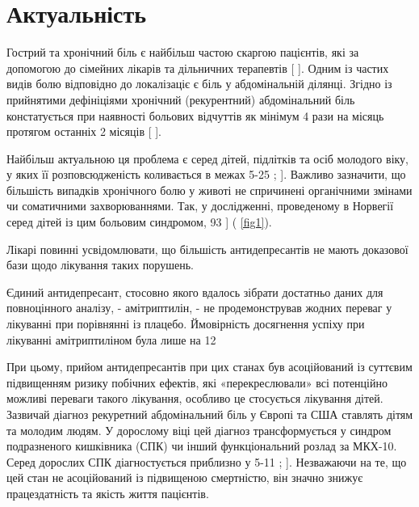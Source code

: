 \section {Актуальність}
Гострий та хронічний біль є найбільш частою скаргою пацієнтів, які 
 за допомогою до сімейних лікарів та дільничних терапевтів [
\cite{1}]. Одним із частих видів болю відповідно до локалізаціє є біль у абдомінальній ділянці. Згідно із прийнятими дефініціями хронічний (рекурентний) абдомінальний біль констатується при наявності больових відчуттів як мінімум 4 рази на місяць протягом останніх 2 місяців [
\cite{2}]. 
\par 
Найбільш актуальною ця проблема є серед дітей, підлітків та осіб молодого віку, у яких її розповсюдженість коливається в межах 5-25%
\cite{2}; 
\cite{3}]. Важливо зазначити, що більшість випадків хронічного болю у животі не спричинені органічними змінами чи соматичними захворюваннями. Так, у дослідженні, проведеному в Норвегії серед дітей із цим больовим синдромом, 93%
\cite{4}] (
\ref{fig1}). 
\par 
\item Лікарі повинні усвідомлювати, що більшість антидепресантів не мають доказової бази щодо лікування таких порушень.
\item Єдиний антидепресант, стосовно якого вдалось зібрати достатньо даних для повноцінного аналізу, - амітриптилін, - не продемонстрував жодних переваг у лікуванні при порівнянні із плацебо. Ймовірність досягнення успіху при лікуванні амітриптиліном була лише на 12%
\item При цьому, прийом антидепресантів при цих станах був асоційований із суттєвим підвищенням ризику побічних ефектів, які «перекреслювали» всі потенційно можливі переваги такого лікування, особливо це стосується лікування дітей.
Зазвичай діагноз рекуретний абдомінальний біль у Європі та США ставлять дітям та молодим людям. У дорослому віці цей діагноз трансформується у синдром подразненого кишківника (СПК) чи інший функціональний розлад за МКХ-10. Серед дорослих СПК діагностується приблизно у 5-11%
\cite{5};
\cite{6}]. Незважаючи на те, що цей стан не асоційований із підвищеною смертністю, він значно знижує працездатність та якість життя пацієнтів. 
